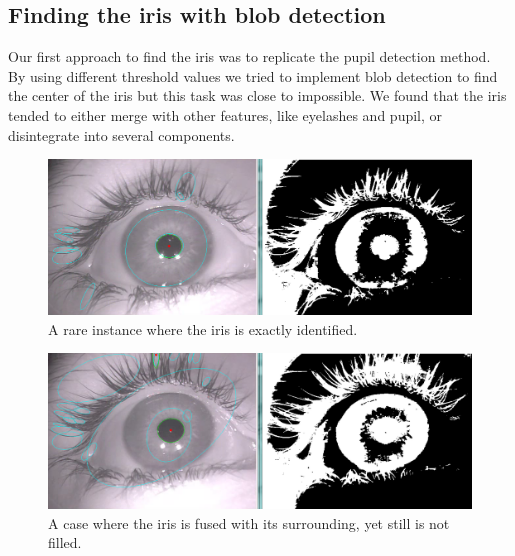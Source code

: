 \subsection{Finding the iris with blob detection}
Our first approach to find the iris was to replicate the pupil detection method. By using different threshold values we tried to implement blob detection to find the center of the iris but this task was close to impossible. We found that the iris tended to either merge with other features, like eyelashes and pupil, or disintegrate into several components.
\begin{figure}[h]
	\centering
	\includegraphics[scale=0.3]{iris_threshold_good.png}
	\caption{A rare instance where the iris is exactly identified.}
\end{figure}
\begin{figure}[h]
	\centering
	\includegraphics[scale=0.3]{iris_threshold_bad.png}
	\caption{A case where the iris is fused with its surrounding, yet still is not filled.}
\end{figure}
\newline
